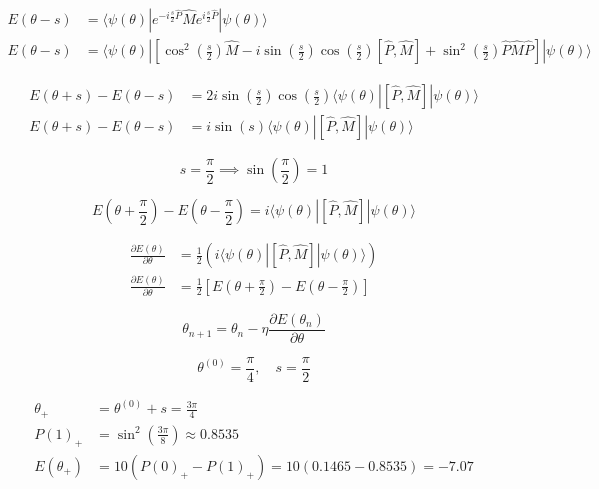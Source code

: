 \begin{align}
    E(\theta - s) &= \langle \psi(\theta) | e^{-i \frac{s}{2} \hat{P}} \hat{M} e^{i \frac{s}{2} \hat{P}} | \psi(\theta) \rangle \\
    E(\theta - s) &= \langle \psi(\theta) | \left[ \cos^2\left(\frac{s}{2}\right) \hat{M} - i \sin\left(\frac{s}{2}\right)\cos\left(\frac{s}{2}\right) [\hat{P}, \hat{M}] + \sin^2\left(\frac{s}{2}\right) \hat{P} \hat{M} \hat{P} \right] | \psi(\theta) \rangle
\end{align}

\begin{align}
    E(\theta + s) - E(\theta - s) &= 2i \sin\left(\frac{s}{2}\right)\cos\left(\frac{s}{2}\right) \langle \psi(\theta) | [\hat{P}, \hat{M}] | \psi(\theta) \rangle \\
    E(\theta + s) - E(\theta - s) &= i \sin(s) \langle \psi(\theta) | [\hat{P}, \hat{M}] | \psi(\theta) \rangle
\end{align}

\begin{equation}
    s = \frac{\pi}{2} \implies \sin\left(\frac{\pi}{2}\right) = 1
\end{equation}

\begin{equation}
    E\left(\theta + \frac{\pi}{2}\right) - E\left(\theta - \frac{\pi}{2}\right) = i \langle \psi(\theta) | [\hat{P}, \hat{M}] | \psi(\theta) \rangle
\end{equation}

\begin{align}
    \frac{\partial E(\theta)}{\partial \theta} &= \frac{1}{2} \left( i \langle \psi(\theta) | [\hat{P}, \hat{M}] | \psi(\theta) \rangle \right) \\
    \frac{\partial E(\theta)}{\partial \theta} &= \frac{1}{2} \left[ E\left(\theta + \frac{\pi}{2}\right) - E\left(\theta - \frac{\pi}{2}\right) \right]
\end{align}

\begin{equation}
    \theta_{n+1} = \theta_n - \eta \frac{\partial E(\theta_n)}{\partial \theta}
\end{equation}

\begin{equation}
    \theta^{(0)} = \frac{\pi}{4}, \quad s = \frac{\pi}{2}
\end{equation}

\begin{align}
    \theta_+ &= \theta^{(0)} + s = \frac{3\pi}{4} \\
    P(1)_+ &= \sin^2\left(\frac{3\pi}{8}\right) \approx 0.8535 \\
    E(\theta_+) &= 10(P(0)_+ - P(1)_+) = 10(0.1465 - 0.8535) = -7.07
\end{align}

